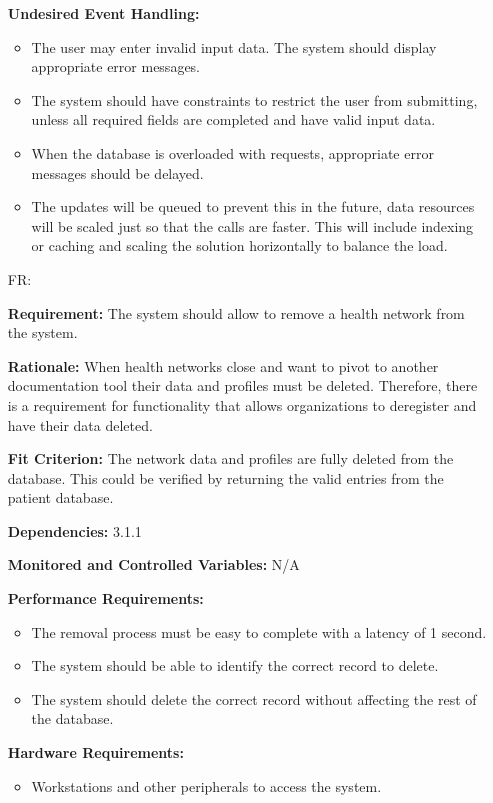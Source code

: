 \documentclass[12pt]{article}
\newcounter{reqnum} %
\begin{document}
\begin{itemize}
\textbf{Undesired Event Handling:} 
\begin{itemize}
  \item The user may enter invalid input data. The system should display appropriate error messages. 
  \item The system should have constraints to restrict the user from submitting, unless all required fields are completed and have valid input data. 
  \item When the database is overloaded with requests, appropriate error messages should be delayed. 
  \item The updates will be queued to prevent this in the future, data resources will be scaled just so that the calls are faster. This will include indexing or caching and scaling the solution horizontally to balance the load.
\end{itemize}


\item[FR\refstepcounter{reqnum}\thereqnum \label{FR_meaningfulLabel}:]  

\textbf{Requirement:} The system should allow to remove a health network from the system.

\textbf{Rationale:} 
When health networks close and want to pivot to another documentation tool their data and profiles must be deleted. Therefore, there is a requirement for functionality that allows organizations to deregister and have their data deleted.

\textbf{Fit Criterion:} 
The network data and profiles are fully deleted from the database. This could be verified by returning the valid entries from the patient database.

\textbf{Dependencies:} 3.1.1

\textbf{Monitored and Controlled Variables:} N/A

\textbf{Performance Requirements:} 
\begin{itemize}
  \item The removal process must be easy to complete with a latency of 1 second. 
  \item The system should be able to identify the correct record to delete. 
  \item The system should delete the correct record without affecting the rest of the database. 
\end{itemize}

\textbf{Hardware Requirements:} 
\begin{itemize}
  \item Workstations and other peripherals to access the system.
\end{itemize}


\end{itemize}
\end{document}
